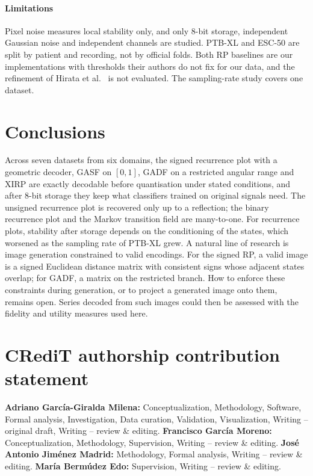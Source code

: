 \documentclass[preprint,review,12pt]{elsarticle}
\begin{document}
\paragraph{Limitations}
Pixel noise measures local stability only, and only 8-bit storage, independent Gaussian noise and independent channels are studied. PTB-XL and ESC-50 are split by patient and recording, not by official folds. Both RP baselines are our implementations with thresholds their authors do not fix for our data, and the refinement of Hirata et al.~\cite{hirata2021fast} is not evaluated. The sampling-rate study covers one dataset.

\section{Conclusions}\label{sec:conclusions}
Across seven datasets from six domains, the signed recurrence plot with a geometric decoder, GASF on $[0,1]$, GADF on a restricted angular range and XIRP are exactly decodable before quantisation under stated conditions, and after 8-bit storage they keep what classifiers trained on original signals need. The unsigned recurrence plot is recovered only up to a reflection; the binary recurrence plot and the Markov transition field are many-to-one. For recurrence plots, stability after storage depends on the conditioning of the states, which worsened as the sampling rate of PTB-XL grew. A natural line of research is image generation constrained to valid encodings. For the signed RP, a valid image is a signed Euclidean distance matrix with consistent signs whose adjacent states overlap; for GADF, a matrix on the restricted branch. How to enforce these constraints during generation, or to project a generated image onto them, remains open. Series decoded from such images could then be assessed with the fidelity and utility measures used here.

\section*{CRediT authorship contribution statement}
\noindent\textbf{Adriano García-Giralda Milena:} Conceptualization, Methodology, Software, Formal analysis, Investigation, Data curation, Validation, Visualization, Writing -- original draft, Writing -- review \& editing.
\textbf{Francisco García Moreno:} Conceptualization, Methodology, Supervision, Writing -- review \& editing.
\textbf{José Antonio Jiménez Madrid:} Methodology, Formal analysis, Writing -- review \& editing.
\textbf{María Bermúdez Edo:} Supervision, Writing -- review \& editing.
\end{document}
